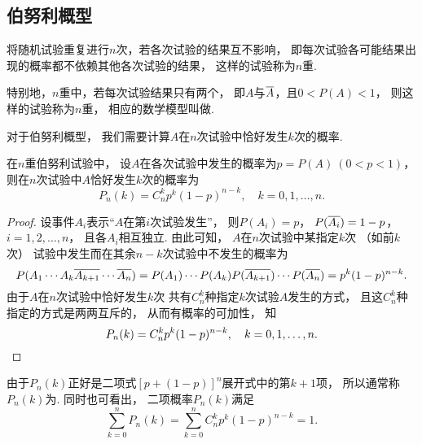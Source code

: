 \subsection{伯努利概型}
\begin{definition}
将随机试验重复进行\(n\)次，若各次试验的结果互不影响，
即每次试验各可能结果出现的概率都不依赖其他各次试验的结果，
这样的试验称为\(n\)重.

特别地，\(n\)重中，若每次试验结果只有两个，
即\(A\)与\(\SetComplementaryL{A}\)，且\(0 < P(A) < 1\)，
则这样的试验称为\(n\)重，
相应的数学模型叫做.
\end{definition}

对于伯努利概型，
我们需要计算\(A\)在\(n\)次试验中恰好发生\(k\)次的概率.

\begin{theorem}[二项概率]
在\(n\)重伯努利试验中，
设\(A\)在各次试验中发生的概率为\(p = P(A)\ (0 < p < 1)\)，
则在\(n\)次试验中\(A\)恰好发生\(k\)次的概率为\begin{equation}
	P_n(k) = C_n^k p^k (1-p)^{n-k}, \quad k=0,1,\dotsc,n.
\end{equation}
\begin{proof}
设事件\(A_i\)表示“\(A\)在第\(i\)次试验发生”，
则\(P(A_i)=p\)，
\(P(\SetComplementaryL{A_i})=1-p\)，
\(i=1,2,\dotsc,n\)，
且各\(A_i\)相互独立.
由此可知，
\(A\)在\(n\)次试验中某指定\(k\)次
（如前\(k\)次）
试验中发生而在其余\(n-k\)次试验中不发生的概率为\begin{equation*}
	P(A_1 \dotsm A_k \SetComplementaryL{A_{k+1}} \dotsm \SetComplementaryL{A_n})
	= P(A_1) \dotsm P(A_k) P(\SetComplementaryL{A_{k+1}}) \dotsm P(\SetComplementaryL{A_n})
	= p^k (1-p)^{n-k}.
\end{equation*}
由于\(A\)在\(n\)次试验中恰好发生\(k\)次
共有\(C_n^k\)种指定\(k\)次试验\(A\)发生的方式，
且这\(C_n^k\)种指定的方式是两两互斥的，
从而有概率的可加性，
知\begin{equation*}
	P_n(k) = C_n^k p^k (1-p)^{n-k},
	\quad k=0,1,\dotsc,n.
	\qedhere
\end{equation*}
\end{proof}
\end{theorem}
由于\(P_n(k)\)正好是二项式\([p+(1-p)]^n\)展开式中的第\(k+1\)项，
所以通常称\(P_n(k)\)为.
同时也可看出，
二项概率\(P_n(k)\)满足\begin{equation}
	\sum_{k=0}^n P_n(k)
	= \sum_{k=0}^n C_n^k p^k (1-p)^{n-k} = 1.
\end{equation}

